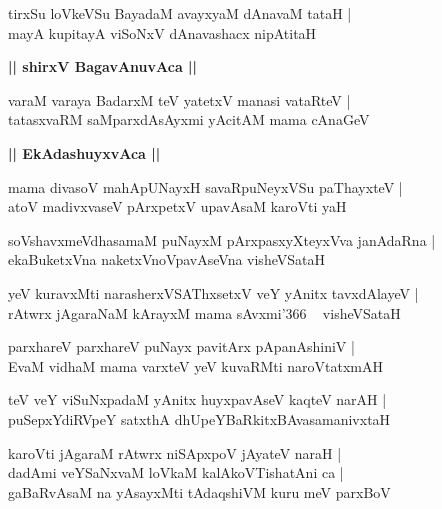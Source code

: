 \documentclass[twoside,12pt,openright]{book}
\newcounter{shloka}[chapter]
\def\uvaca#1{\centerline{{\large\textbf{#1}}}}
\begin{document}
\begin{shloka}%
tirxSu loVkeVSu BayadaM avayxyaM dAnavaM tataH |\\
mayA kupitayA viSoNxV dAnavashacx nipAtitaH
\end{shloka}

\uvaca{|| shirxV BagavAnuvAca ||}

\begin{shloka}%
varaM varaya BadarxM teV yatetxV manasi vataRteV |\\
tatasxvaRM saMparxdAsAyxmi yAcitAM mama cAnaGeV
\end{shloka}

\uvaca{|| EkAdashuyxvAca ||}

\begin{shloka}%
mama divasoV mahApUNayxH savaRpuNeyxVSu paThayxteV |\\
atoV madivxvaseV pArxpetxV upavAsaM karoVti yaH 
\end{shloka}

\begin{shloka}%
soVshavxmeVdhasamaM puNayxM pArxpasxyXteyxVva janAdaRna |\\
ekaBuketxVna naketxVnoVpavAseVna visheVSataH
\end{shloka}

\begin{shloka}%
yeV kuravxMti narasherxVSAThxsetxV veY yAnitx tavxdAlayeV |\\
rAtwrx jAgaraNaM kArayxM mama sAvxmi\char'366 ~ visheVSataH 
\end{shloka}

\begin{shloka}%
parxhareV parxhareV puNayx pavitArx pApanAshiniV |\\
EvaM vidhaM mama varxteV yeV kuvaRMti naroVtatxmAH 
\end{shloka}

\begin{shloka}%
teV veY viSuNxpadaM yAnitx huyxpavAseV kaqteV narAH |\\
puSepxYdiRVpeY satxthA dhUpeYBaRkitxBAvasamanivxtaH
\end{shloka}

\begin{shloka}%
karoVti jAgaraM rAtwrx niSApxpoV jAyateV naraH |\\
dadAmi veYSaNxvaM loVkaM kalAkoVTishatAni ca |\\
gaBaRvAsaM na yAsayxMti tAdaqshiVM kuru meV parxBoV
\end{shloka}
\end{document}
